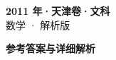 \documentclass[zihao=-4, a4paper]{ctexart}
\begin{document}
\begin{center}
  {\Large\bfseries 2011 年·天津卷·文科}\\[4pt]
  {\large 数学 · 解析版}
\end{center}
\medskip
{}

\clearpage
{}
\begin{center}{\Large\bfseries 参考答案与详细解析}\end{center}
\medskip

\end{document}
